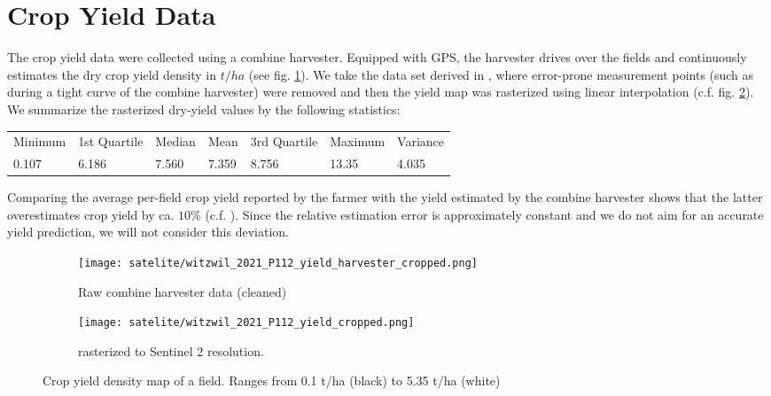 {{		%
		
		

	}
}

\section{Crop Yield Data}{
	\label{sec:yieldmapping_data}
	The crop yield data were collected using a combine harvester. Equipped with GPS, the harvester drives over the fields and continuously estimates the dry crop yield density in $t/ha$ (see fig. \ref{fig:satelite/witzwil_2021_P112_yield_harvester_cropped}). 
	We take the data set derived in \cite{perichPixelbasedCropYield2022}, where error-prone measurement points (such as during a tight curve of the combine harvester) were removed and then the yield map was rasterized using linear interpolation (c.f. fig. \ref{fig:satelite/witzwil_2021_P112_yield_cropped.png}). We summarize the rasterized dry-yield values by the following statistics:

	\begin{tabular}{l l l l l l l} 
		Minimum & 1st Quartile & Median & Mean  & 3rd Quartile & Maximum & Variance \\
		0.107   & 6.186        & 7.560  & 7.359 & 8.756        & 13.35   & 4.035
	\end{tabular}    

	Comparing the average per-field crop yield reported by the farmer with the yield estimated by the combine harvester shows that the latter overestimates crop yield by ca. $10\%$ (c.f. \cite{perichPixelbasedCropYield2022}). Since the relative estimation error is approximately constant and we do not aim for an accurate yield prediction, we will not consider this deviation. 



	\begin{figure}
		\centering
		\begin{subfigure}{.5\textwidth}
			\centering
			\texttt{[image: satelite/witzwil\_2021\_P112\_yield\_harvester\_cropped.png]}
			\caption{Raw combine harvester data (cleaned)}
			\label{fig:satelite/witzwil_2021_P112_yield_harvester_cropped}
		\end{subfigure}%
		\begin{subfigure}{.5\textwidth}
			\centering
			\texttt{[image: satelite/witzwil\_2021\_P112\_yield\_cropped.png]}
			\caption{rasterized to Sentinel 2 resolution.}
			\label{fig:satelite/witzwil_2021_P112_yield_cropped.png}
		\end{subfigure}
		\caption{Crop yield density map of a field. Ranges from 0.1 t/ha (black) to 5.35 t/ha (white) }
		\label{fig:satelite_witzwil_yield}
	\end{figure}

}

